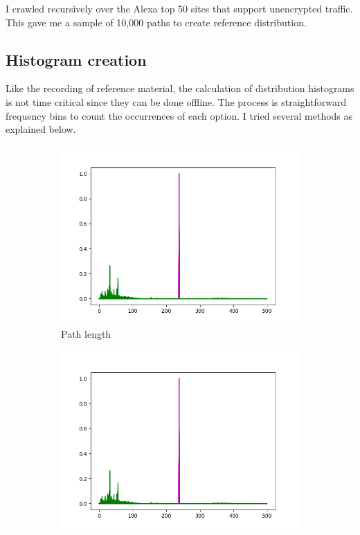 \documentclass[10pt,a4paper]{article}
\begin{document}
I crawled recursively over the Alexa top 50 sites\cite{alexa} that support unencrypted traffic. This gave me a sample of 10,000 paths to create reference distribution.

\subsection{Histogram creation}

Like the recording of reference material, the calculation of distribution histograms is not time critical since they can be done offline. The process is straightforward frequency bins to count the occurrences of each option. I tried several methods as explained below.


\begin{figure}[h]
	\centering
	\begin{subfigure}[b]{0.24\textwidth}
		\includegraphics[width=\textwidth]{bob}
		\caption{Path length}
		\label{fig:length_hist}
	\end{subfigure}
	\begin{subfigure}[b]{0.24\textwidth}
		\includegraphics[width=\textwidth]{bob}

\end{subfigure}
\end{figure}
\end{document}
